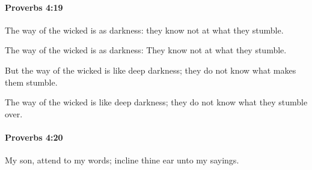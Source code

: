 		\paragraph{Proverbs 4:19} %
			\label{PROVERBS-4-19}

			The way of the wicked is as darkness: they know not at what they stumble.

			\begin{versebox}
					\item[BHS] 
					\item[ASV] The way of the wicked is as darkness: They know not at what they stumble.
					\item[NIV] But the way of the wicked is like deep darkness; they do not know what makes them stumble.
					\item[NRSV] The way of the wicked is like deep darkness; they do not know what they stumble over.
			\end{versebox}

		\paragraph{Proverbs 4:20} %
			\label{PROVERBS-4-20}

			My son, attend to my words; incline thine ear unto my sayings.

